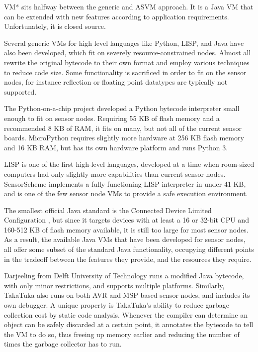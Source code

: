 VM* \cite{Koshy:2005ww} sits halfway between the generic and ASVM approach. It is a Java VM that can be extended with new features according to application requirements. Unfortunately, it is closed source.

Several generic VMs for high level languages like Python, LISP, and Java have also been developed, which fit on severely resource-constrained nodes. Almost all rewrite the original bytecode to their own format and employ various techniques to reduce code size. Some functionality is sacrificed in order to fit on the sensor nodes, for instance reflection or floating point datatypes are typically not supported.

The Python-on-a-chip project \cite{python-on-a-chip} developed a Python bytecode interpreter small enough to fit on sensor nodes. Requiring 55 KB of flash memory and a recommended 8 KB of RAM, it fits on many, but not all of the current sensor boards. MicroPython \cite{micropython} requires slightly more hardware at 256 KB flash memory and 16 KB RAM, but has its own hardware platform and runs Python 3.

LISP is one of the first high-level languages, developed at a time when room-sized computers had only slightly more capabilities than current sensor nodes. SensorScheme \cite{Evers:2010ur} implements a fully functioning LISP interpreter in under 41 KB, and is one of the few sensor node VMs to provide a safe execution environment.


The smallest official Java standard is the Connected Device Limited Configuration \cite{CLDC}, but since it targets devices with at least a 16 or 32-bit CPU and 160-512 KB of flash memory available, it is still too large for most sensor nodes. As a result, the available Java VMs that have been developed for sensor nodes, all offer some subset of the standard Java functionality, occupying different points in the tradeoff between the features they provide, and the resources they require.

Darjeeling \cite{Brouwers:2009cj} from Delft University of Technology runs a modified Java bytecode, with only minor restrictions, and supports multiple platforms. Similarly, TakaTuka \cite{Aslam:2008} also runs on both AVR and MSP based sensor nodes, and includes its own debugger. A unique property is TakaTuka's ability to reduce garbage collection cost by static code analysis. Whenever the compiler can determine an object can be safely discarded at a certain point, it annotates the bytecode to tell the VM to do so, thus freeing up memory earlier and reducing the number of times the garbage collector has to run. 

